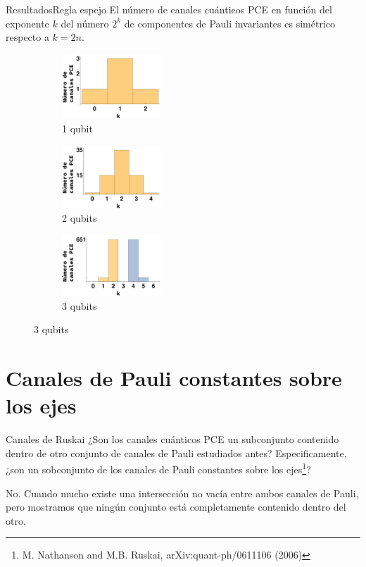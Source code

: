 \documentclass[xcolor=dvipsnames,presentation]{beamer}%
\begin{document}
\begin{frame}{Resultados}{Regla espejo}
El número de canales cuánticos PCE en función del exponente $k$ del 
número $2^k$ de componentes de Pauli invariantes es simétrico respecto a 
$k=2n$.

	\begin{figure} %
	\centering
	\begin{subfigure}[b]{0.48\textwidth}
		\centering
		\includegraphics[width=3.7cm]	{mirroring_1qubits}
		\caption{1 qubit}
		\label{fig:mirroring_1qubit}
	\end{subfigure}
	\hfill
	\begin{subfigure}[b]{0.48\textwidth}
		\centering
		\hfill 
		\includegraphics[width=3.7cm]{mirroring_2qubits} 
		\hfill \hfill
		\caption{2 qubits}
		\label{fig:mirroring_2qubits}
	\end{subfigure}
	\newline
	\begin{subfigure}[c]{\textwidth}
		\centering
		\hspace*{\fill}
		\includegraphics[width=3.7cm]{mirroring_3qubits}
		\hspace*{\fill}
		\caption{3 qubits}
		\label{fig:mirroring_3qubits}
	\end{subfigure}
	\label{fig:mirroring}
\end{figure} %
\end{frame}

\section{Canales de Pauli constantes sobre los ejes}
\begin{frame}{Canales de Ruskai}
	¿Son los canales cuánticos PCE un subconjunto contenido dentro de 
	otro conjunto de canales de Pauli estudiados antes? Especificamente,
	¿son un sobconjunto de los canales de Pauli constantes sobre los ejes\footnote{
	M. Nathanson and M.B. Ruskai, arXiv:quant-ph/0611106 (2006)}? \vfill
	
	No. Cuando mucho existe una intersección no vacía entre ambos 
	canales de Pauli, pero mostramos que ningún conjunto está 
	completamente contenido dentro	del otro.
\end{frame}
\end{document}

